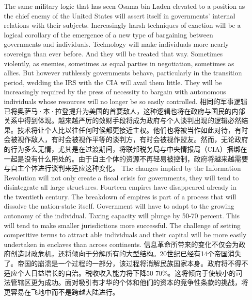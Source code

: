 \begin{paracol}{2}[]
\switchcolumn*
The same military logic that has seen Osama bin Laden elevated to a position as the chief enemy of the United States will assert itself in governments' internal relations with their subjects. Increasingly harsh techniques of exaction will be a logical corollary of the emergence of a new type of bargaining between governments and individuals. Technology will make individuals more nearly sovereign than ever before. And they will be treated that way. Sometimes violently, as enemies, sometimes as equal parties in negotiation, sometimes as allies. But however ruthlessly governments behave, particularly in the transition period, wedding the IRS with the CIA will avail them little. They will be increasingly required by the press of necessity to bargain with autonomous individuals whose resources will no longer be so easily controlled.
\switchcolumn
相同的军事逻辑已将奥萨马·本·拉登提升为美国的首要敌人，这种逻辑也将在政府与国民的内部关系中得到体现。越来越严厉的敛财手段将成为政府与个人谈判出现的逻辑必然结果。技术将让个人比以往任何时候都更接近主权。他们也将被当作如此对待，有时会被视作敌人，有时会被视作平等的谈判方，有时会被视作盟友。然而，无论政府的行为多么无情，尤其是在过渡期间，将联邦税务局与中央情报局（CIA）捆绑在一起是没有什么用处的。由于自主个体的资源不再轻易被控制，政府将越来越需要与自主个体进行谈判来适应这种变化。
\switchcolumn*
The changes implied by the Information Revolution will not only create a fiscal crisis for governments, they will tend to disintegrate all large structures. Fourteen empires have disappeared already in the twentieth century. The breakdown of empires is part of a process that will dissolve the nation-state itself. Government will have to adapt to the growing autonomy of the individual. Taxing capacity will plunge by 50-70 percent. This will tend to make smaller jurisdictions more successful. The challenge of setting competitive terms to attract able individuals and their capital will be more easily undertaken in enclaves than across continents.
\switchcolumn
信息革命所带来的变化不仅会为政府创造财政危机，还将倾向于分解所有的大型结构。20世纪已经有14个帝国消失了。帝国的崩溃是一个过程的一部分，该过程将消解民族国家本身。政府将不得不适应个人日益增长的自治。税收收入能力将下降50-70\%。这将倾向于使较小的司法管辖区更为成功。面对吸引有才华的个体和他们的资本的竞争性条款的挑战，将更容易在飞地中而不是跨越大陆进行。
\switchcolumn*

\end{paracol}
